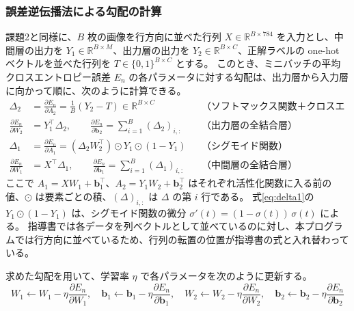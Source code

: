 \documentclass[a4paper,11pt]{ltjsarticle}
\begin{document}
\subsubsection{誤差逆伝播法による勾配の計算}
課題2と同様に、$B$ 枚の画像を行方向に並べた行列 $X \in \mathbb{R}^{B \times 784}$ を入力とし、中間層の出力を $Y_1 \in \mathbb{R}^{B \times M}$、出力層の出力を $Y_2 \in \mathbb{R}^{B \times C}$、正解ラベルの one-hot ベクトルを並べた行列を $T \in \{0,1\}^{B \times C}$ とする。
このとき、ミニバッチの平均クロスエントロピー誤差 $E_n$ の各パラメータに対する勾配は、出力層から入力層に向かって順に、次のように計算できる。
\begin{align}
  \Delta_2 &= \frac{\partial E_n}{\partial A_2} = \frac{1}{B}\left(Y_2 - T\right) \in \mathbb{R}^{B \times C}
    && \text{（ソフトマックス関数＋クロスエントロピー誤差）} \label{eq:delta2}\\
  \frac{\partial E_n}{\partial W_2} &= Y_1^{\top} \Delta_2, \qquad
  \frac{\partial E_n}{\partial \bm{b}_2} = \sum_{i=1}^{B} (\Delta_2)_{i,:}
    && \text{（出力層の全結合層）} \label{eq:grad2}\\
  \Delta_1 &= \frac{\partial E_n}{\partial A_1} = \left(\Delta_2 W_2^{\top}\right) \odot Y_1 \odot \left(1 - Y_1\right)
    && \text{（シグモイド関数）} \label{eq:delta1}\\
  \frac{\partial E_n}{\partial W_1} &= X^{\top} \Delta_1, \qquad
  \frac{\partial E_n}{\partial \bm{b}_1} = \sum_{i=1}^{B} (\Delta_1)_{i,:}
    && \text{（中間層の全結合層）} \label{eq:grad1}
\end{align}
ここで $A_1 = X W_1 + \bm{b}_1^{\top}$、$A_2 = Y_1 W_2 + \bm{b}_2^{\top}$ はそれぞれ活性化関数に入る前の値、$\odot$ は要素ごとの積、$(\Delta)_{i,:}$ は $\Delta$ の第 $i$ 行である。
式\eqref{eq:delta1}の $Y_1 \odot (1 - Y_1)$ は、シグモイド関数の微分 $\sigma'(t) = (1 - \sigma(t))\,\sigma(t)$ による。
指導書では各データを列ベクトルとして並べているのに対し、本プログラムでは行方向に並べているため、行列の転置の位置が指導書の式と入れ替わっている。

求めた勾配を用いて、学習率 $\eta$ で各パラメータを次のように更新する。
\begin{equation}
  W_1 \leftarrow W_1 - \eta \frac{\partial E_n}{\partial W_1}, \quad
  \bm{b}_1 \leftarrow \bm{b}_1 - \eta \frac{\partial E_n}{\partial \bm{b}_1}, \quad
  W_2 \leftarrow W_2 - \eta \frac{\partial E_n}{\partial W_2}, \quad
  \bm{b}_2 \leftarrow \bm{b}_2 - \eta \frac{\partial E_n}{\partial \bm{b}_2}
  \label{eq:update}
\end{equation}
\end{document}
